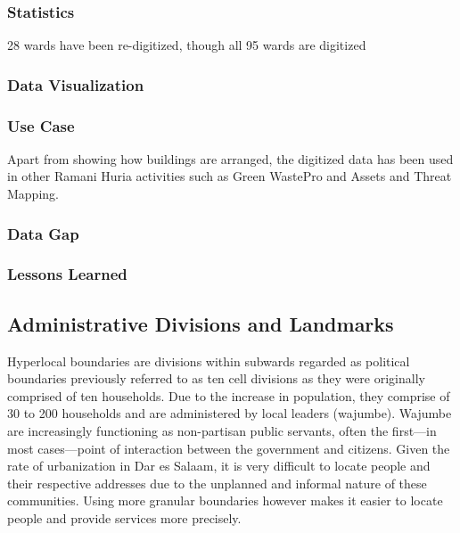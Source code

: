 \documentclass[a4paper,12pt,twoside]{article}
\begin{document}
\subsubsection{Statistics}
28 wards have been re-digitized, though all 95 wards are digitized

\subsubsection{Data Visualization}

\subsubsection{Use Case}
Apart from showing how buildings are arranged, the digitized data has been used in other Ramani Huria activities such as Green WastePro and Assets and Threat Mapping.

\subsubsection{Data Gap}

\subsubsection{Lessons Learned}

\newpage
\subsection{Administrative Divisions and Landmarks}
Hyperlocal boundaries are divisions within subwards regarded as political boundaries previously referred to as ten cell divisions as they were originally comprised of ten households.
Due to the increase in population, they comprise of 30 to 200 households and are administered by local leaders (wajumbe). Wajumbe are increasingly functioning as non-partisan public servants, often the first---in most cases---point of interaction between the government and citizens.
Given the rate of urbanization in Dar es Salaam, it is very difficult to locate people and their respective addresses due to the unplanned and informal nature of these communities. Using more granular boundaries however makes it easier to locate people and provide services more precisely. 
\end{document}
